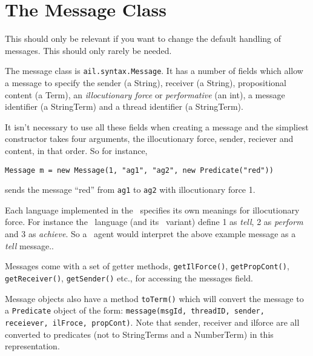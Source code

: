 \section{The Message Class}
This should only be relevant if you want to change the default handling of messages.  This should only rarely be needed.

The message class is \texttt{ail.syntax.Message}.  It has a number of fields which allow a message to specify the sender (a String), receiver (a String), propositional content (a Term), an \emph{illocutionary force} or \emph{performative} (an int), a message identifier (a StringTerm) and a thread identifier (a StringTerm).

It isn't necessary to use all these fields when creating a message and the simpliest constructor takes four arguments, the illocutionary force, sender, reciever and content, in that order.  So for instance,

\texttt{Message m = new Message(1, "ag1", "ag2", new Predicate("red"))}

\noindent sends the message ``red'' from \texttt{ag1} to \texttt{ag2} with illocutionary force 1.

Each language implemented in the \ail\ specifies its own meanings for illocutionary force.  For instance the \gwendolen\ language (and its \eass\ variant) define 1 as \emph{tell}, 2 as \emph{perform} and 3 as \emph{achieve}.  So a \gwendolen\ agent would interpret the above example message as a \emph{tell} message..

Messages come with a set of getter methods, \texttt{getIlForce()}, \texttt{getPropCont()}, \texttt{getReceiver()}, \texttt{getSender()} etc., for accessing the messages field.

Message objects also have a method \texttt{toTerm()} which will convert the message to a \texttt{Predicate} object of the form: \texttt{message(msgId, threadID, sender, receiever, ilFroce, propCont)}.  Note that sender, receiver and ilforce are all converted to predicates (not to StringTerms and a NumberTerm) in this representation.

